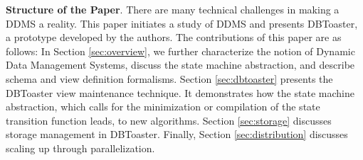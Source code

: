 {\bf Structure of the Paper}\/.
There are many technical challenges in making a DDMS a reality. This paper
initiates a study of DDMS and presents DBToaster, a prototype developed by
the authors. The contributions of this paper are as follows:
In Section \ref{sec:overview}, we further characterize the notion of Dynamic Data
Management Systems, discuss the state machine abstraction, and describe
schema and view definition formalisms.
Section \ref{sec:dbtoaster} presents the DBToaster view maintenance technique. It demonstrates how
the state machine abstraction, which calls for the minimization or compilation
of the state transition function leads, to new algorithms.
Section \ref{sec:storage} discusses storage management in DBToaster.
Finally, Section \ref{sec:distribution} discusses scaling up through parallelization.

